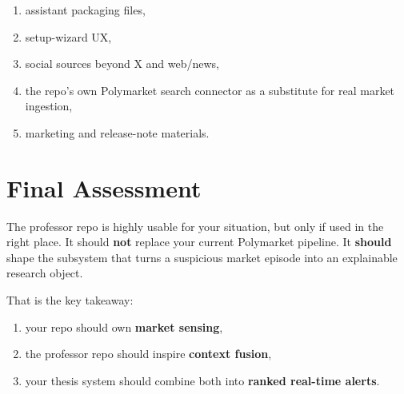 \documentclass[11pt, letterpaper]{article}
\begin{document}
\begin{enumerate}[nosep]
    \item assistant packaging files,
    \item setup-wizard UX,
    \item social sources beyond X and web/news,
    \item the repo's own Polymarket search connector as a substitute for real market ingestion,
    \item marketing and release-note materials.
\end{enumerate}

\section{Final Assessment}

The professor repo is highly usable for your situation, but only if used in the right place. It should \textbf{not} replace your current Polymarket pipeline. It \textbf{should} shape the subsystem that turns a suspicious market episode into an explainable research object.

That is the key takeaway:

\begin{enumerate}[nosep]
    \item your repo should own \textbf{market sensing},
    \item the professor repo should inspire \textbf{context fusion},
    \item your thesis system should combine both into \textbf{ranked real-time alerts}.
\end{enumerate}
\end{document}

